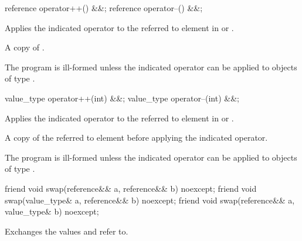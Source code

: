 \begin{itemdecl}
reference operator++() &&;
reference operator--() &&;
\end{itemdecl}
\begin{itemdescr}
  \pnum\effects Applies the indicated operator to the referred to element in \simd or \mask.

  \pnum\returns A copy of .

  \pnum\remarks The program is ill-formed unless the indicated operator can be applied to objects of type .%
\end{itemdescr}

\begin{itemdecl}
value_type operator++(int) &&;
value_type operator--(int) &&;
\end{itemdecl}
\begin{itemdescr}
  \pnum\effects Applies the indicated operator to the referred to element in \simd or \mask.

  \pnum\returns A copy of the referred to element before applying the indicated operator.

  \pnum\remarks The program is ill-formed unless the indicated operator can be applied to objects of type .%
\end{itemdescr}

\begin{itemdecl}
friend void swap(reference&& a, reference&& b) noexcept;
friend void swap(value_type& a, reference&& b) noexcept;
friend void swap(reference&& a, value_type& b) noexcept;
\end{itemdecl}
\begin{itemdescr}
  \pnum\effects Exchanges the values  and  refer to.
\end{itemdescr}

